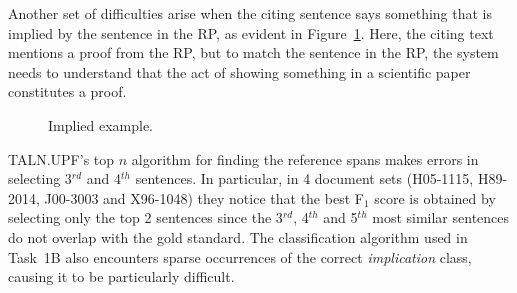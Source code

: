 \documentclass[11pt]{article}
\begin{document}
Another set of difficulties arise when the citing sentence says
something that is implied by the sentence in the RP, as evident in
Figure~\ref{f:3}.  Here, the citing text mentions a proof from the RP,
but to match the sentence in the RP, the system needs to understand
that the act of showing something in a scientific paper constitutes a
proof.

\begin{figure}[h]
\noindent{}
\caption{Implied example.}
\label{f:3}
\end{figure}

TALN.UPF's top $n$ algorithm for finding the reference spans makes
errors in selecting 3$^{rd}$ and 4$^{th}$ sentences. In
particular, in 4 document sets (H05-1115, H89-2014, J00-3003 and
X96-1048) they notice that the best F$_1$ score is obtained by
selecting only the top 2 sentences since the 3$^{rd}$, 4$^{th}$ and
5$^{th}$ most similar sentences do not overlap with the gold
standard. The classification algorithm used in Task~1B also encounters
sparse occurrences of the correct \textit{implication} class, causing
it to be particularly difficult.
\end{document}
